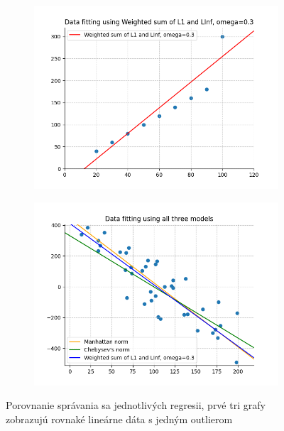 \documentclass[report.tex]{subfiles}
\begin{document}
\begin{figure}[h!]
\begin{subfigure}[b]{0.48\linewidth}
		\includegraphics[width=\linewidth]{figs/weighted_linear_with_outlier.png}
	\end{subfigure}
	\begin{subfigure}[b]{0.48\linewidth}
		\includegraphics[width=\linewidth]{figs/all_three_random.png}
	\end{subfigure}
	\caption*{\centering Porovnanie správania sa jednotlivých regresii, prvé tri grafy zobrazujú rovnaké lineárne dáta s jedným outlierom}
\end{figure}
\end{document}
